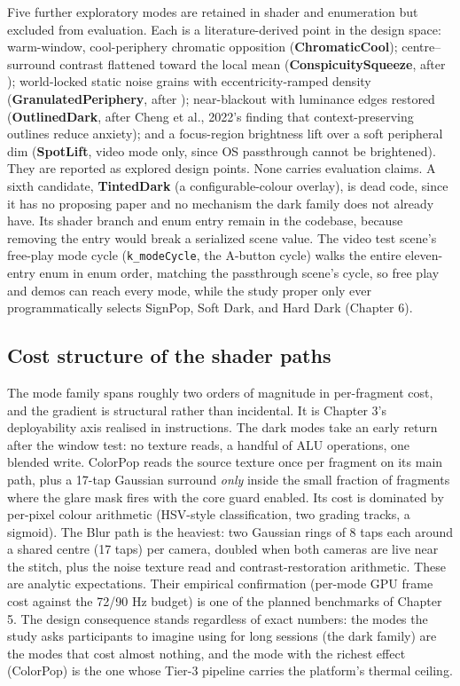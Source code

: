 Five further exploratory modes are retained in shader and enumeration but excluded from evaluation.
Each is a literature-derived point in the design space: warm-window, cool-periphery chromatic
opposition (\textbf{ChromaticCool}); centre–surround contrast flattened toward the local mean
(\textbf{ConspicuitySqueeze}, after \citealp{veas2011}); world-locked static noise grains with
eccentricity-ramped density (\textbf{GranulatedPeriphery}, after \citealp{cao2021}); near-blackout with
luminance edges restored (\textbf{OutlinedDark}, after Cheng et al., 2022's finding that
context-preserving outlines reduce anxiety); and a focus-region brightness lift over a soft
peripheral dim (\textbf{SpotLift}, video mode only, since OS passthrough cannot be brightened). They
are reported as explored design points. None carries evaluation claims. A sixth candidate,
\textbf{TintedDark} (a configurable-colour overlay), is dead code, since it has no proposing paper and
no mechanism the dark family does not already have. Its shader branch and enum entry remain in the
codebase, because removing the entry would break a serialized scene value. The video test scene's
free-play mode cycle (\verb|k_modeCycle|, the A-button cycle) walks the entire eleven-entry enum in
enum order, matching the passthrough scene's cycle, so free play and demos can reach every mode,
while the study proper only ever programmatically selects SignPop, Soft Dark, and Hard Dark
(Chapter 6).

\subsection{Cost structure of the shader paths}

The mode family spans roughly two orders of magnitude in per-fragment cost, and the gradient is
structural rather than incidental. It is Chapter 3's deployability axis realised in instructions. The
dark modes take an early return after the window test: no texture reads, a handful of ALU
operations, one blended write. ColorPop reads the source texture once per fragment on its main path,
plus a 17-tap Gaussian surround \textit{only} inside the small fraction of fragments where the glare mask
fires with the core guard enabled. Its cost is dominated by per-pixel colour arithmetic (HSV-style
classification, two grading tracks, a sigmoid). The Blur path is the heaviest: two Gaussian rings of
8 taps each around a shared centre (17 taps) per camera, doubled when both cameras are live near the
stitch, plus the noise texture read and contrast-restoration arithmetic. These are analytic
expectations. Their empirical confirmation (per-mode GPU frame cost against the 72/90 Hz budget) is
one of the planned benchmarks of Chapter 5. The design consequence stands regardless of exact
numbers: the modes the study asks participants to imagine using for long sessions (the dark family)
are the modes that cost almost nothing, and the mode with the richest effect (ColorPop) is the one
whose Tier-3 pipeline carries the platform's thermal ceiling.

